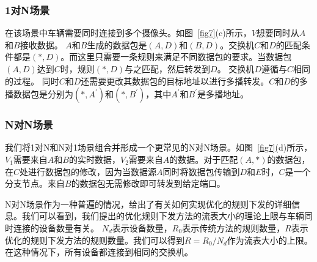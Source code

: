 \subsubsection{1对N场景} \label{1 to N}

在该场景中车辆需要同时连接到多个摄像头。如图~\ref{fig7}(c)所示，$V$想要同时从$A$和$B$接收数据。 $A$和$B$生成的数据包是$(A, D)$和$(B, D)$。交换机$C$和$D$的匹配条件都是$(*, D)$。而这里只需要一条规则来满足不同数据包的要求。当数据包$(A, D)$达到$C$时，规则$(*,D)$与之匹配，然后转发到$D$。 交换机$D$遵循与$C$相同的过程。 同时$C$和$D$还需要更改其数据包的目标地址以进行多播转发。$C$和$D$的多播数据包是分别为$(*,A^{'})$和$(*,B^{'})$，其中$A^{'}$和$B^{'}$是多播地址。




\subsubsection{N对N场景} \label{N to N}

我们将1对N和N对1场景组合并形成一个更常见的N对N场景。如图~\ref{fig7}(d)所示，$V_{1}$需要来自$A$和$B$的实时数据，$V_{2}$需要来自$A$的数据。对于匹配$(A, *)$的数据包，在$C$处进行数据包的修改，因为当数据源$A$同时将数据包传输到$D$和$E$时，$C$是一个分支节点。来自$B$的数据包无需修改即可转发到给定端口。

%

N对N场景作为一种普遍的情况，给出了有关如何实现优化的规则下发的详细信息。我们可以看到，我们提出的优化规则下发方法的流表大小的理论上限与车辆同时连接的设备数量有关。 $N_{d}$表示设备数量，$R_{0}$表示传统方法的规则数量，$R$表示优化的规则下发方法的规则数量。我们可以得到$R = R_{0}/N_{d}$作为流表大小的上限。在这种情况下，所有设备都连接到相同的交换机。

